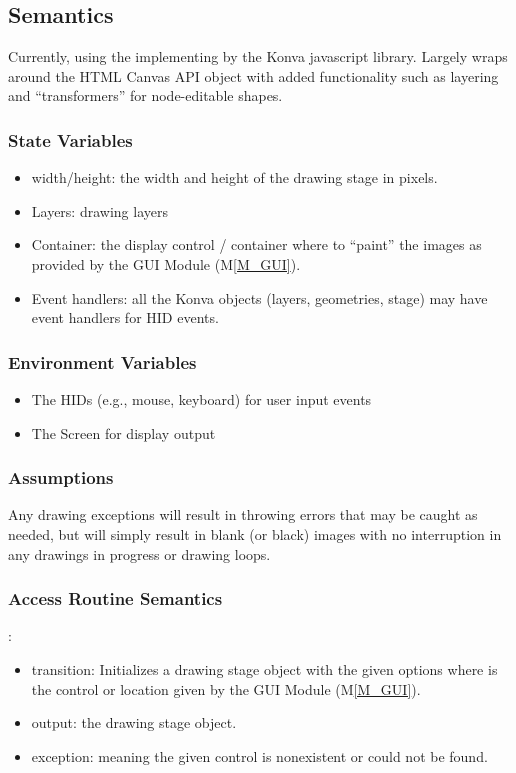 \documentclass[12pt, titlepage]{article}
\newcommand{\mref}[1]{M\ref{#1}}
\newcommand{\mrefp}[1]{(\mref{#1})}
\newcommand{\mreff}[1]{Module \mrefp{#1}}
\begin{document}
\subsection{Semantics}
Currently, using the implementing by the Konva \cite{konva_2021} javascript library.
Largely wraps around the HTML Canvas API object with added functionality such as layering
and ``transformers'' for node-editable shapes.

\subsubsection{State Variables}
\begin{itemize}
  \item width/height: the width and height of the drawing stage in pixels.
  \item Layers: drawing layers
  \item Container: the display control / container where to ``paint'' the images
    as provided by the GUI \mreff{M_GUI}.
  \item Event handlers: all the Konva objects (layers, geometries, stage) may
    have event handlers for HID events.
\end{itemize}

\subsubsection{Environment Variables}
\begin{itemize}
  \item The HIDs (e.g., mouse, keyboard) for user input events
  \item The Screen for display output
\end{itemize}

\subsubsection{Assumptions}
Any drawing exceptions will result in throwing errors that may be caught as needed,
but will simply result in blank (or black) images with no interruption in any
drawings in progress or drawing loops.

\subsubsection{Access Routine Semantics}

\noindent {}:
\begin{itemize}
\item transition: Initializes a drawing stage object with the given options
  where  is the control or location given by the GUI \mreff{M_GUI}.
\item output: the drawing stage object.
\item exception:  meaning the given control is nonexistent or could not be found.
\end{itemize}
\end{document}
